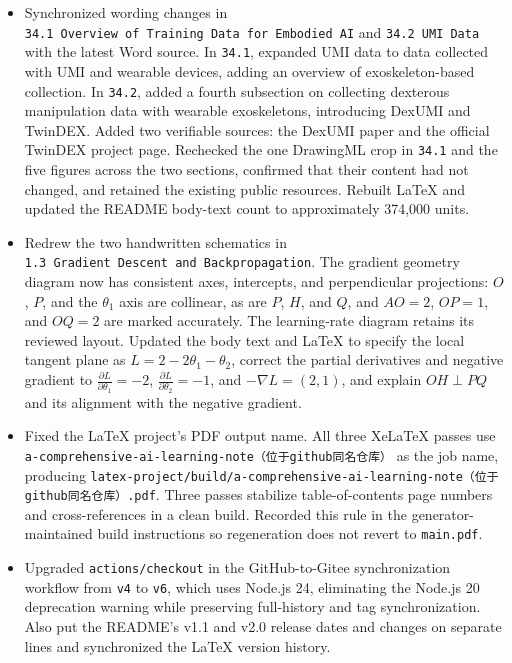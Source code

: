 \begin{itemize}
\item
  Synchronized wording changes in \texttt{34.1\ Overview\ of\ Training\ Data\ for\ Embodied\ AI} and \texttt{34.2\ UMI\ Data} with the latest Word source. In \texttt{34.1}, expanded UMI data to data collected with UMI and wearable devices, adding an overview of exoskeleton-based collection. In \texttt{34.2}, added a fourth subsection on collecting dexterous manipulation data with wearable exoskeletons, introducing DexUMI and TwinDEX. Added two verifiable sources: the DexUMI paper and the official TwinDEX project page. Rechecked the one DrawingML crop in \texttt{34.1} and the five figures across the two sections, confirmed that their content had not changed, and retained the existing public resources. Rebuilt LaTeX and updated the README body-text count to approximately 374,000 units.
\item
  Redrew the two handwritten schematics in \texttt{1.3\ Gradient\ Descent\ and\ Backpropagation}. The gradient geometry diagram now has consistent axes, intercepts, and perpendicular projections: \(O\), \(P\), and the \(\theta_1\) axis are collinear, as are \(P\), \(H\), and \(Q\), and \(AO=2\), \(OP=1\), and \(OQ=2\) are marked accurately. The learning-rate diagram retains its reviewed layout. Updated the body text and LaTeX to specify the local tangent plane as \(L=2-2\theta_1-\theta_2\), correct the partial derivatives and negative gradient to \(\frac{\partial L}{\partial\theta_1}=-2\), \(\frac{\partial L}{\partial\theta_2}=-1\), and \(-\nabla L=(2,1)\), and explain \(OH\perp PQ\) and its alignment with the negative gradient.
\item
  Fixed the LaTeX project's PDF output name. All three XeLaTeX passes use \texttt{a-comprehensive-ai-learning-note（位于github同名仓库）} as the job name, producing \texttt{latex-project/build/a-comprehensive-ai-learning-note（位于github同名仓库）.pdf}. Three passes stabilize table-of-contents page numbers and cross-references in a clean build. Recorded this rule in the generator-maintained build instructions so regeneration does not revert to \texttt{main.pdf}.
\item
  Upgraded \texttt{actions/checkout} in the GitHub-to-Gitee synchronization workflow from \texttt{v4} to \texttt{v6}, which uses Node.js 24, eliminating the Node.js 20 deprecation warning while preserving full-history and tag synchronization. Also put the README's v1.1 and v2.0 release dates and changes on separate lines and synchronized the LaTeX version history.

\end{itemize}
